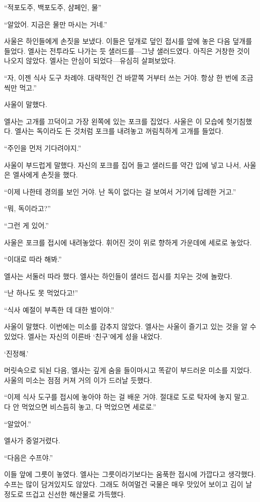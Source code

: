 ``적포도주, 백포도주, 샴페인, 물''

``알았어. 지금은 물만 마시는 거네.''

사울은 하인들에게 손짓을 보냈다. 이들은 덮개로 덮인 접시를 앞에 놓은 다음 덮개를 들었다. 엘사는 전투라도 나가는 듯 샐러드를—그냥 샐러드였다. 아직은 거창한 것이 나오지 않았다. 엘사는 안심이 되었다—유심히 살펴보았다.

``자, 이젠 식사 도구 차례야. 대략적인 건 바깥쪽 거부터 쓰는 거야. 항상 한 번에 조금씩만 먹고.''

사울이 말했다.

엘사는 고개를 끄덕이고 가장 왼쪽에 있는 포크를 집었다. 사울은 이 모습에 헛기침했다. 엘사는 독이라도 든 것처럼 포크를 내려놓고 꺼림칙하게 고개를 들었다.

``주인을 먼저 기다려야지.''

사울이 부드럽게 말했다. 자신의 포크를 집어 들고 샐러드를 약간 입에 넣고 나서, 사울은 엘사에게 손짓을 했다.

``이제 나한테 경의를 보인 거야. 난 독이 없다는 걸 보여서 거기에 답례한 거고.''

``뭐, 독이라고?''

``그런 게 있어.''

사울은 포크를 접시에 내려놓았다. 휘어진 것이 위로 향하게 가운데에 세로로 놓았다.

``이대로 따라 해봐.''

엘사는 서둘러 따라 했다. 엘사는 하인들이 샐러드 접시를 치우는 것에 놀랐다.

``난 하나도 못 먹었다고!''

``식사 예절이 부족한 데 대한 벌이야.''

사울이 말했다. 이번에는 미소를 감추지 않았다. 엘사는 사울이 즐기고 있는 것을 알 수 있었다. 엘사는 자신의 이른바 `친구'에게 성을 내었다.

`진정해.'

머릿속으로 되뇐 다음, 엘사는 깊게 숨을 들이마시고 똑같이 부드러운 미소를 지었다. 사울의 미소는 점점 커져 거의 이가 드러날 듯했다.

``이제 식사 도구를 접시에 놓아야 하는 걸 배운 거야. 절대로 도로 탁자에 놓지 말고. 다 안 먹었으면 비스듬히 놓고, 다 먹었으면 세로로.''

``알았어.''

엘사가 중얼거렸다.

``다음은 수프야.''

이들 앞에 그릇이 놓였다. 엘사는 그릇이라기보다는 움푹한 접시에 가깝다고 생각했다. 수프는 많이 담겨있지도 않았다. 그래도 허여멀건 국물은 매우 맛있어 보이고 김이 날 정도로 뜨겁고 신선한 해산물로 가득했다.

